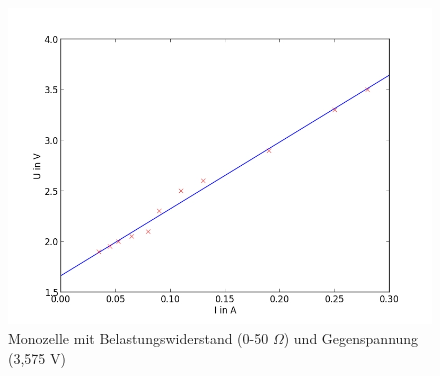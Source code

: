 	\begin{figure}[h]
		\begin{center}
		\includegraphics[scale=0.5]{picc.jpg}
		\caption{Monozelle mit Belastungswiderstand (0-50 $\Omega$) und Gegenspannung (3,575 V)}
		\label{picc}
		\end{center}	
	\end{figure}